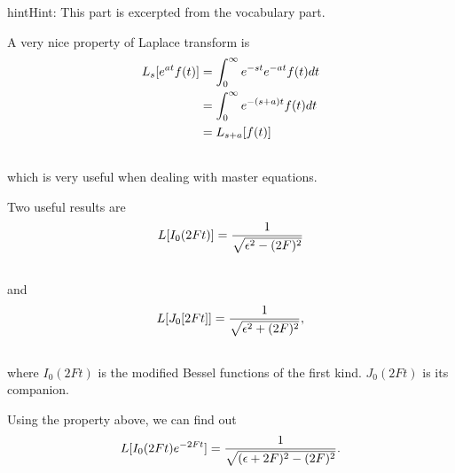 \documentclass[letterpaper,10pt,english]{sphinxmanual}
\begin{document}
\begin{notice}{hint}{Hint:}
This part is excerpted from the vocabulary part.

A very nice property of Laplace transform is
\begin{gather}
\begin{split}L_s [e^{at}f(t)] &= \int_0^\infty e^{-st} e^{-at} f(t) dt \\
& =  \int_0^\infty e^{-(s+a)t}f(t) dt \\
& = L_{s+a}[f(t)]\end{split}\notag\\\begin{split}\end{split}\notag
\end{gather}
which is very useful when dealing with master equations.

Two useful results are
\begin{gather}
\begin{split}L[I_0(2Ft)] = \frac{1}{\sqrt{ \epsilon^2 - (2F)^2 }}\end{split}\notag\\\begin{split}\end{split}\notag
\end{gather}
and
\begin{gather}
\begin{split}L[J_0[2Ft]]  = \frac{1}{\sqrt{\epsilon^2 + (2F)^2}},\end{split}\notag\\\begin{split}\end{split}\notag
\end{gather}
where $I_0(2Ft)$ is the modified Bessel functions of the first kind. $J_0(2Ft)$ is its companion.

Using the property above, we can find out
\begin{gather}
\begin{split}L[I_0(2Ft)e^{-2Ft}]  = \frac{1}{\sqrt{(\epsilon + 2F)^2 - (2F)^2}} .\end{split}\notag\\\begin{split}\end{split}\notag
\end{gather}\end{notice}
\end{document}
